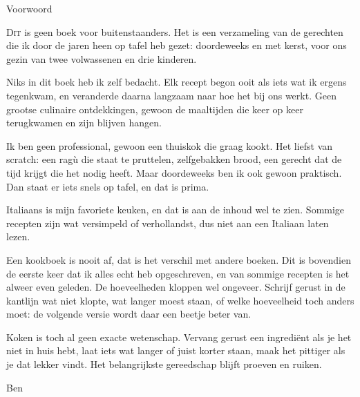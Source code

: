 \thispagestyle{plain}
\vspace*{0.4cm}
{\handfont\fontsize{60}{60}\selectfont\color{terracotta}Voorwoord}\par
\vspace{8pt}{\color{terracotta}\rule{2.6cm}{0.5pt}\;\raisebox{-0.2ex}{$\scriptstyle\blacklozenge$}}\par
\vspace{1.4em}

\lettrine{D}{it} is geen boek voor buitenstaanders. Het is een verzameling van
de gerechten die ik door de jaren heen op tafel heb gezet: doordeweeks en met
kerst, voor ons gezin van twee volwassenen en drie kinderen.

Niks in dit boek heb ik zelf bedacht. Elk recept begon ooit als iets wat ik
ergens tegenkwam, en veranderde daarna langzaam naar hoe het bij ons werkt.
Geen grootse culinaire ontdekkingen, gewoon de maaltijden die keer op keer
terugkwamen en zijn blijven hangen.

Ik ben geen professional, gewoon een thuiskok die graag kookt. Het liefst van
scratch: een ragù die staat te pruttelen, zelfgebakken brood, een gerecht dat
de tijd krijgt die het nodig heeft. Maar doordeweeks ben ik ook gewoon
praktisch. Dan staat er iets snels op tafel, en dat is prima.

Italiaans is mijn favoriete keuken, en dat is aan de inhoud wel te zien.
Sommige recepten zijn wat versimpeld of verhollandst, dus niet aan een Italiaan
laten lezen.

\vspace{0.8em}

Een kookboek is nooit af, dat is het verschil met andere boeken. Dit is
bovendien de eerste keer dat ik alles echt heb opgeschreven, en van sommige
recepten is het alweer even geleden. De hoeveelheden kloppen wel ongeveer.
Schrijf gerust in de kantlijn wat niet klopte, wat langer moest staan, of
welke hoeveelheid toch anders moet: de volgende versie wordt daar een beetje
beter van.

Koken is toch al geen exacte wetenschap. Vervang gerust een ingrediënt als je
het niet in huis hebt, laat iets wat langer of juist korter staan, maak het
pittiger als je dat lekker vindt. Het belangrijkste gereedschap blijft proeven
en ruiken.

\vspace{1.4em}
{\handfont\Large\color{terracotta}Ben}

